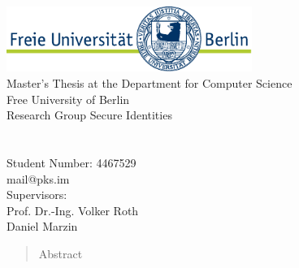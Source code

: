 \begin{titlepage}
    \makeatletter
    \begin{center}
        \includegraphics[width=0.6\textwidth]{resources/fu-logo.pdf}\\
        {\normalsize Master's Thesis at the Department for Computer Science\\Free University of Berlin\\Research Group Secure Identities}\\[8ex]
        {\Large \@title}\\[6ex]
        {\large \@author}\\
        {\normalsize Student Number: 4467529}\\
        {\normalsize mail@pks.im}\\[4ex]
        {\normalsize Supervisors:\\Prof. Dr.-Ing. Volker Roth\\Daniel Marzin}\\[4ex]
        {\normalsize \@date}
    \end{center}
    \makeatother

    \vfill{}
    \begin{abstract}

        Abstract

    \end{abstract}
    \vfill{}
\end{titlepage}

